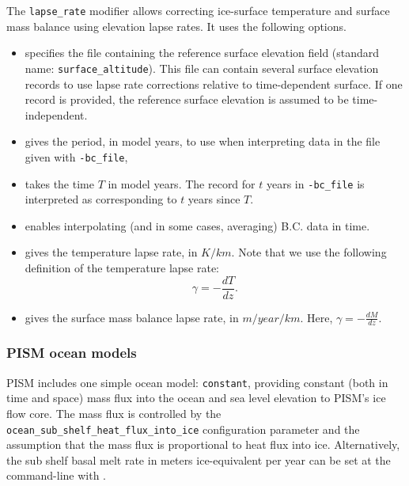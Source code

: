   The \texttt{lapse_rate} modifier allows correcting ice-surface temperature and surface mass balance using elevation lapse rates. It uses the following options.
  \begin{itemize}
  \item {} specifies the file containing the reference surface elevation field (standard name: \texttt{surface_altitude}). This file can contain several surface elevation records to use lapse rate corrections relative to time-dependent surface. If one record is provided, the reference surface elevation is assumed to be time-independent.
  \item {} gives the period, in model years, to use when interpreting data in the file given with \texttt{-bc_file},
  \item {} takes the time $T$ in model years. The record for $t$ years in \texttt{-bc_file} is interpreted as corresponding to $t$ years since $T$.
  \item {} enables interpolating (and in some cases, averaging) B.C. data in time.
  \item {} gives the temperature lapse rate, in $K/km$. Note that we use the following definition of the temperature lapse rate:
    \begin{displaymath}
      \gamma = -\frac{dT}{dz}.
    \end{displaymath}
  \item {} gives the surface mass balance lapse rate, in $m/year/km$. Here, $\gamma=-\frac{dM}{dz}$.
  \end{itemize}


\subsubsection{PISM ocean models}
\label{sec:pism-ocean-models}

PISM includes one simple ocean model: \texttt{constant}, providing constant (both in time and space) mass flux into the ocean and sea level elevation to PISM's ice flow core. The mass flux is controlled by the\\ \texttt{ocean_sub_shelf_heat_flux_into_ice} configuration parameter and the assumption that the mass flux is proportional to heat flux into ice. Alternatively, the sub shelf basal melt rate in meters ice-equivalent per year can be set at the command-line with .

